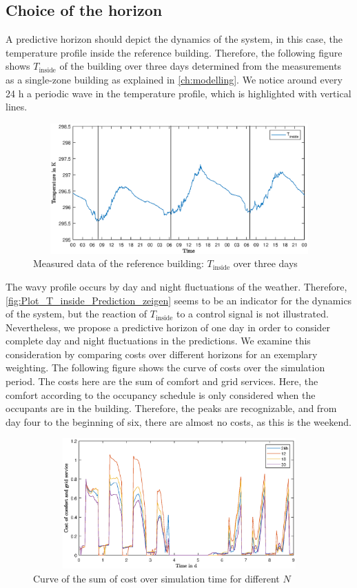 \subsection{Choice of the horizon}
\label{subsec:ChoiceHorizon}
A predictive horizon should depict the dynamics of the system, in this case, the temperature profile inside the reference building. Therefore, the following figure shows $T_\text{inside}$ of the building over three days determined from the measurements as a single-zone building as explained in \autoref{ch:modelling}. We notice around every 24 h a periodic wave in the temperature profile, which is highlighted with vertical lines.\newline
    \begin{figure}[H]
            \centering
            \includegraphics[width=15cm,height=5cm]{figure/Plot_T_inside_Prediction_zeigen.eps}
           \caption{Measured data of the reference building: $T_\text{inside}$ over three days}
            \label{fig:Plot_T_inside_Prediction_zeigen}
    \end{figure}
The wavy profile occurs by day and night fluctuations of the weather. Therefore, \autoref{fig:Plot_T_inside_Prediction_zeigen} seems to be an indicator for the dynamics of the system, but the reaction of $T_\text{inside}$ to a control signal is not illustrated. Nevertheless, we propose a predictive horizon of one day in order to consider complete day and night fluctuations in the predictions. We examine this consideration by comparing costs over different horizons for an exemplary weighting. The following figure shows the curve of costs over the simulation period. The costs here are the sum of comfort and grid services. Here, the comfort according to the occupancy schedule is only considered when the occupants are in the building. Therefore, the peaks are recognizable, and from day four to the beginning of six, there are almost no costs, as this is the weekend.
    \begin{figure}[h]
            \centering
            \includegraphics[width=15cm,height=5cm]{figure/Gesamtkosten_Vergleich_horizonte.eps}
           \caption{Curve of the sum of cost over simulation time for different $N$}
            \label{fig:Gesamtkosten_Vergleich_horizonte}
    \end{figure}
